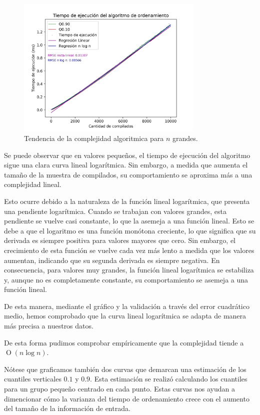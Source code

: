 \begin{figure}[H]
    \centering
    \includegraphics[width=0.8\textwidth]{img/tiempos_valores_altos_puntos.png}
    \caption{Tendencia de la complejidad algoritmica para $n$ grandes.}
    \label{fig:tiempos_valores_altos_puntos}
\end{figure}

Se puede observar que en valores pequeños, el tiempo de ejecución del algoritmo sigue una clara curva lineal logarítmica. Sin embargo, a medida
que aumenta el tamaño de la muestra de compilados, su comportamiento se aproxima más a una complejidad lineal.

Esto ocurre debido a la naturaleza de la función lineal logarítmica, que presenta una pendiente logarítmica. Cuando se 
trabajan con valores grandes, esta pendiente se vuelve casi constante, lo que la asemeja a una función lineal. Esto se 
debe a que el logaritmo es una función monótona creciente, lo que significa que su derivada es siempre positiva para valores 
mayores que cero. Sin embargo, el crecimiento de esta función se vuelve cada vez más lento a medida que los valores aumentan, 
indicando que su segunda derivada es siempre negativa. En consecuencia, para valores muy grandes, la función lineal logarítmica 
se estabiliza y, aunque no es completamente constante, su comportamiento se asemeja a una función lineal.

De esta manera, mediante el gráfico y la validación a través del error cuadrático medio, hemos comprobado que la curva lineal logarítmica 
se adapta de manera más precisa a nuestros datos.

De esta forma pudimos comprobar empíricamente que la complejidad tiende a $\operatorname{O}(n\log{n})$.

Nótese que graficamos también dos curvas que demarcan una estimación de los cuantiles verticales $0.1$ y $0.9$. Esta estimación
se realizó calculando los cuantiles para un grupo pequeño centrado en cada punto. Estas curvas nos ayudan a dimencionar cómo la
varianza del tiempo de ordenamiento crece con el aumento del tamaño de la información de entrada.

